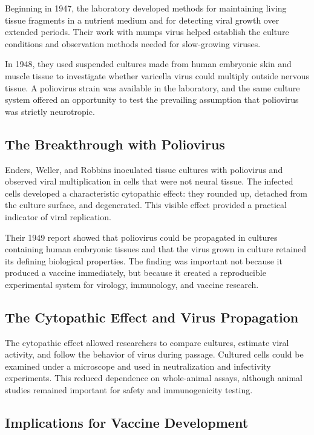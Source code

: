 Beginning in 1947, the laboratory developed methods for maintaining living tissue fragments in a nutrient medium and for detecting viral growth over extended periods. Their work with mumps virus helped establish the culture conditions and observation methods needed for slow-growing viruses.

In 1948, they used suspended cultures made from human embryonic skin and muscle tissue to investigate whether varicella virus could multiply outside nervous tissue. A poliovirus strain was available in the laboratory, and the same culture system offered an opportunity to test the prevailing assumption that poliovirus was strictly neurotropic.

\subsection{The Breakthrough with Poliovirus}

Enders, Weller, and Robbins inoculated tissue cultures with poliovirus and observed viral multiplication in cells that were not neural tissue. The infected cells developed a characteristic cytopathic effect: they rounded up, detached from the culture surface, and degenerated. This visible effect provided a practical indicator of viral replication.

Their 1949 report showed that poliovirus could be propagated in cultures containing human embryonic tissues and that the virus grown in culture retained its defining biological properties. The finding was important not because it produced a vaccine immediately, but because it created a reproducible experimental system for virology, immunology, and vaccine research.

\subsection{The Cytopathic Effect and Virus Propagation}

The cytopathic effect allowed researchers to compare cultures, estimate viral activity, and follow the behavior of virus during passage. Cultured cells could be examined under a microscope and used in neutralization and infectivity experiments. This reduced dependence on whole-animal assays, although animal studies remained important for safety and immunogenicity testing.

\subsection{Implications for Vaccine Development}

